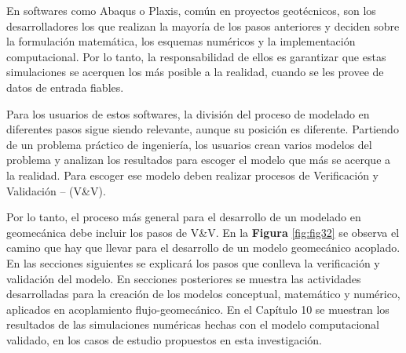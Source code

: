 En softwares como Abaqus o Plaxis, común en proyectos geotécnicos, son los desarrolladores los que realizan la mayoría de los pasos anteriores y deciden sobre la formulación matemática, los esquemas numéricos y la implementación computacional. Por lo tanto, la responsabilidad de ellos es garantizar que estas simulaciones se acerquen los más posible a la realidad, cuando se les provee de datos de entrada fiables.\bigskip 

Para los usuarios de estos softwares, la división del proceso de modelado en diferentes pasos sigue siendo relevante, aunque su posición es diferente. Partiendo de un problema práctico de ingeniería, los usuarios crean varios modelos del problema y analizan los resultados para escoger el modelo que más se acerque a la realidad. Para escoger ese modelo deben realizar procesos de Verificación y Validación – (V\&V).\bigskip

Por lo tanto, el proceso más general para el desarrollo de un modelado en geomecánica debe incluir los pasos de V\&V. En la \textbf{Figura} \ref{fig:fig32} se observa el camino que hay que llevar para el desarrollo de un modelo geomecánico acoplado. En las secciones siguientes se explicará los pasos que conlleva la verificación y validación del modelo. En secciones posteriores se muestra las actividades desarrolladas para la creación de los modelos conceptual, matemático y numérico, aplicados en acoplamiento flujo-geomecánico. En el Capítulo 10 se muestran los resultados de las simulaciones numéricas hechas con el modelo computacional validado, en los casos de estudio propuestos en esta investigación.\bigskip

